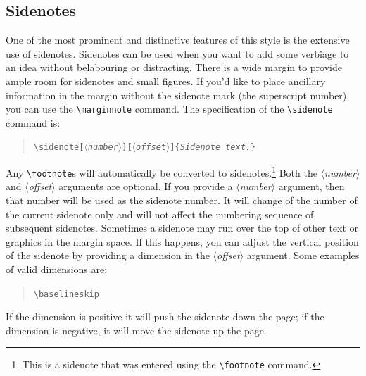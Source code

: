 \documentclass{tufte-handout}
\newcommand{\doccmd}[1]{\texttt{\textbackslash#1}}%
\newcommand{\docopt}[1]{\ensuremath{\langle}\textrm{\textit{#1}}\ensuremath{\rangle}}%
\newcommand{\docarg}[1]{\textrm{\textit{#1}}}%
\newenvironment{docspec}{\begin{quote}\noindent}{\end{quote}}%
\begin{document}
\subsection{Sidenotes}\label{sec:sidenotes}
One of the most prominent and distinctive features of this style is the extensive use of sidenotes.  Sidenotes can be used when you want to add some verbiage to an idea without belabouring or distracting. There is a wide margin to provide ample room for sidenotes and small figures. If you'd like to place ancillary information in the margin without the sidenote mark (the superscript number), you can use the \Verb|\marginnote| command. The specification of the \Verb|\sidenote| command is:
\begin{docspec}
  \doccmd{sidenote[\docopt{number}][\docopt{offset}]\{\docarg{Sidenote text.}\}}
\end{docspec}

Any \Verb|\footnote|s will automatically be converted to sidenotes.\footnote{This is a sidenote that was entered using the \texttt{\textbackslash footnote} command.}  
Both the \docopt{number} and \docopt{offset} arguments are optional.  If you provide a \docopt{number} argument, then that number will be used as the sidenote number.  It will change of the number of the current sidenote only and will not affect the numbering sequence of subsequent sidenotes. Sometimes a sidenote may run over the top of other text or graphics in the
margin space.  If this happens, you can adjust the vertical position of the sidenote by providing a dimension in the \docopt{offset} argument.  Some examples of valid dimensions are:
\begin{docspec}
  \ttfamily 1.0in \qquad 2.54cm \qquad 254mm \Verb|\baselineskip|
\end{docspec}
If the dimension is positive it will push the sidenote down the page; if the dimension is negative, it will move the sidenote up the page.
\end{document}
